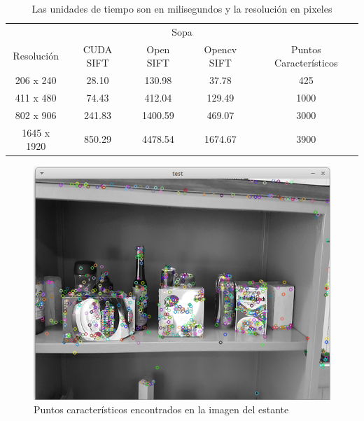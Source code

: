 \begin{table}[phtb]
\centering
\begin{tabular}{|c|c|c|c|c|}
\hline

\multicolumn{5}{|c|}{Sopa} \\
\cline{1-5}
Resolución & CUDA SIFT & Open SIFT & Opencv SIFT & Puntos Característicos\\
\hline \hline
 206 x 240  & 28.10  &  130.98  & 37.78   & 425\\ \cline{1-5}
 411 x 480  & 74.43  &  412.04  & 129.49  & 1000\\ \cline{1-5}
 802 x 906  & 241.83 &  1400.59 & 469.07  & 3000\\ \cline{1-5}
1645 x 1920 & 850.29 &  4478.54 & 1674.67 & 3900\\ \cline{1-5}

\end{tabular}
\caption{Las unidades de tiempo son en milisegundos y la resolución en pixeles}
\label{tabla:final}
\end{table}




\begin{figure}[ph]
			\centering
				\includegraphics[scale=0.75]{img/estante.png}
			\caption{Puntos característicos encontrados en la imagen del estante}
\end{figure}


